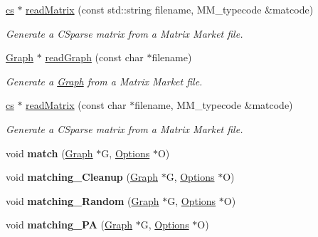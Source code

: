 \begin{DoxyCompactItemize}
\hyperlink{struct_mongoose_1_1cs__sparse}{cs} $\ast$ \hyperlink{namespace_mongoose_a155be3fa8b76110fb4a0a69cd220de4c}{read\+Matrix} (const std\+::string filename, M\+M\+\_\+typecode \&matcode)
\begin{DoxyCompactList}\small\item\em Generate a C\+Sparse matrix from a Matrix Market file. \end{DoxyCompactList}\item 
\hyperlink{class_mongoose_1_1_graph}{Graph} $\ast$ \hyperlink{namespace_mongoose_a13ce6efb0d1b7dc6420eeda564b03511}{read\+Graph} (const char $\ast$filename)
\begin{DoxyCompactList}\small\item\em Generate a \hyperlink{class_mongoose_1_1_graph}{Graph} from a Matrix Market file. \end{DoxyCompactList}\item 
\hyperlink{struct_mongoose_1_1cs__sparse}{cs} $\ast$ \hyperlink{namespace_mongoose_a008f29c7dc05d2436f6e82e117d80ab8}{read\+Matrix} (const char $\ast$filename, M\+M\+\_\+typecode \&matcode)
\begin{DoxyCompactList}\small\item\em Generate a C\+Sparse matrix from a Matrix Market file. \end{DoxyCompactList}\item 
\hypertarget{namespace_mongoose_aefab310f2e333537524d66169cce451a}{}\label{namespace_mongoose_aefab310f2e333537524d66169cce451a} 
void {\bfseries match} (\hyperlink{class_mongoose_1_1_graph}{Graph} $\ast$G, \hyperlink{struct_mongoose_1_1_options}{Options} $\ast$O)
\item 
\hypertarget{namespace_mongoose_a9b0d5724549e229dc9a3369d5e15f97e}{}\label{namespace_mongoose_a9b0d5724549e229dc9a3369d5e15f97e} 
void {\bfseries matching\+\_\+\+Cleanup} (\hyperlink{class_mongoose_1_1_graph}{Graph} $\ast$G, \hyperlink{struct_mongoose_1_1_options}{Options} $\ast$O)
\item 
\hypertarget{namespace_mongoose_a5b1b17d3dd6b054c56f78da1aa0df2b7}{}\label{namespace_mongoose_a5b1b17d3dd6b054c56f78da1aa0df2b7} 
void {\bfseries matching\+\_\+\+Random} (\hyperlink{class_mongoose_1_1_graph}{Graph} $\ast$G, \hyperlink{struct_mongoose_1_1_options}{Options} $\ast$O)
\item 
\hypertarget{namespace_mongoose_ad924122b4fa833866881a36e50421485}{}\label{namespace_mongoose_ad924122b4fa833866881a36e50421485} 
void {\bfseries matching\+\_\+\+PA} (\hyperlink{class_mongoose_1_1_graph}{Graph} $\ast$G, \hyperlink{struct_mongoose_1_1_options}{Options} $\ast$O)

\end{DoxyCompactItemize}
